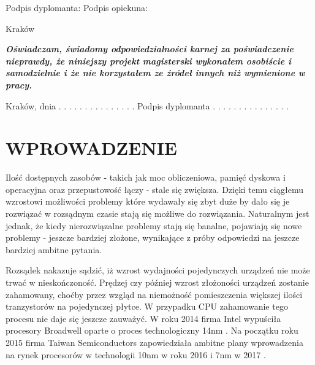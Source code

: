 \documentclass[12pt,a4paper,twoside]{article}
\begin{document}
\begin{center}
Podpis dyplomanta: \hspace{150pt} Podpis opiekuna:

\vspace{72pt}
Kraków \@date
\end{center}

\newpage
{} %
\setcounter{page}{2} %

\textit{
\textbf{ Oświadczam, świadomy odpowiedzialności karnej za poświadczenie nieprawdy, że niniejszy projekt magisterski wykonałem osobiście i samodzielnie i że nie korzystałem ze źródeł innych niż wymienione w pracy.
}}

\vspace{33pt}

\noindent
Kraków, dnia  . . . . . . . . .	. . . . . . 
\hspace{108pt} 
Podpis dyplomanta  . . . . . . . . . . . . . . . 

\newpage

\tableofcontents

\newpage

\section{WPROWADZENIE}


Ilość dostępnych zasobów - takich jak moc obliczeniowa, pamięć dyskowa i operacyjna oraz przepustowość łączy - stale się zwiększa. Dzięki temu ciągłemu wzrostowi możliwości problemy które wydawały się zbyt duże by dało się je rozwiązać w rozsądnym czasie stają się możliwe do rozwiązania. Naturalnym jest jednak, że kiedy nierozwiązalne problemy stają się banalne, pojawiają się nowe problemy - jeszcze bardziej złożone, wynikające z próby odpowiedzi na jeszcze bardziej ambitne pytania.


Rozsądek nakazuje sądzić, iż wzrost wydajności pojedynczych urządzeń nie może trwać w nieskończoność. Prędzej czy później wzrost złożoności urządzeń zostanie zahamowany, choćby przez wzgląd na niemożność pomieszczenia większej ilości tranzystorów na pojedynczej płytce. W przypadku CPU zahamowanie tego procesu nie daje się jeszcze zauważyć. W roku 2014 firma Intel wypuściła procesory Broadwell oparte o proces technologiczny 14nm \cite{intel14nm}. Na początku roku 2015 firma Taiwan Semiconductors zapowiedziała ambitne plany wprowadzenia na rynek procesorów w technologii 10nm w roku 2016 i 7nm w 2017 \cite{tsmc}.
\end{document}
